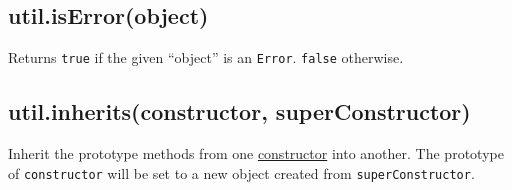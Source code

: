 \begin{Shaded}
\begin{Highlighting}[]
 \NormalTok{(}\NormalTok{);}

\NormalTok{(} \NormalTok{())}
\NormalTok{(}\NormalTok{())}
\NormalTok{(\{\})}
\end{Highlighting}
\end{Shaded}

\subsection{util.isError(object)}\label{util.iserrorobject}

Returns \texttt{true} if the given ``object'' is an \texttt{Error}.
\texttt{false} otherwise.

\begin{Shaded}
\begin{Highlighting}[]
 \NormalTok{(}\NormalTok{);}

\NormalTok{(} \NormalTok{())}
\NormalTok{(} \NormalTok{())}
\NormalTok{(\{ }\NormalTok{: }\NormalTok{, }\NormalTok{: } \NormalTok{\})}
\end{Highlighting}
\end{Shaded}

\subsection{util.inherits(constructor,
superConstructor)}\label{util.inheritsconstructor-superconstructor}

Inherit the prototype methods from one
\href{https://developer.mozilla.org/en/JavaScript/Reference/Global_Objects/Object/constructor}{constructor}
into another. The prototype of \texttt{constructor} will be set to a new
object created from \texttt{superConstructor}.

